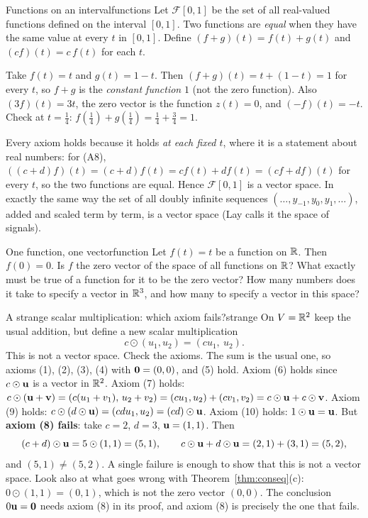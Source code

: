 \documentclass[11pt]{article}
\begin{document}
\begin{exmp}{Functions on an interval}{functions}
Let $\mathcal{F}[0,1]$ be the set of all real-valued functions defined on the interval $[0,1]$. Two functions are \emph{equal} when they have the same value at every $t$ in $[0,1]$. Define $(f+g)(t)=f(t)+g(t)$ and $(cf)(t)=c\,f(t)$ for each $t$.

Take $f(t)=t$ and $g(t)=1-t$. Then $(f+g)(t)=t+(1-t)=1$ for every $t$, so $f+g$ is the \emph{constant function} $1$ (not the zero function). Also $(3f)(t)=3t$, the zero vector is the function $z(t)=0$, and $(-f)(t)=-t$. Check at $t=\tfrac14$: $f(\tfrac14)+g(\tfrac14)=\tfrac14+\tfrac34=1$.

Every axiom holds because it holds \emph{at each fixed $t$}, where it is a statement about real numbers: for (A8), $((c+d)f)(t)=(c+d)f(t)=cf(t)+df(t)=(cf+df)(t)$ for every $t$, so the two functions are equal. Hence $\mathcal{F}[0,1]$ is a vector space. In exactly the same way the set of all doubly infinite sequences $(\dots,y_{-1},y_0,y_1,\dots)$, added and scaled term by term, is a vector space (Lay calls it the space of signals).
\end{exmp}

\begin{think}{One function, one vector}{function}
Let $f(t)=t$ be a function on $\mathbb{R}$. Then $f(0)=0$. Is $f$ the zero vector of the space of all functions on $\mathbb{R}$? What exactly must be true of a function for it to be the zero vector? How many numbers does it take to specify a vector in $\mathbb{R}^3$, and how many to specify a vector in this space?
\end{think}

\begin{exmp}{A strange scalar multiplication: which axiom fails?}{strange}
On $V=\mathbb{R}^2$ keep the usual addition, but define a new scalar multiplication
\[
c\odot(u_1,u_2)=(cu_1,\ u_2).
\]
This is not a vector space. Check the axioms. The sum is the usual one, so axioms (1), (2), (3), (4) with $\mathbf{0}=(0,0)$, and (5) hold. Axiom (6) holds since $c\odot\mathbf{u}$ is a vector in $\mathbb{R}^2$. Axiom (7) holds: $c\odot(\mathbf{u}+\mathbf{v})=(c(u_1+v_1),\,u_2+v_2)=(cu_1,u_2)+(cv_1,v_2)=c\odot\mathbf{u}+c\odot\mathbf{v}$. Axiom (9) holds: $c\odot(d\odot\mathbf{u})=(cdu_1,u_2)=(cd)\odot\mathbf{u}$. Axiom (10) holds: $1\odot\mathbf{u}=\mathbf{u}$. But \textbf{axiom (8) fails}: take $c=2$, $d=3$, $\mathbf{u}=(1,1)$. Then
\[
(c+d)\odot\mathbf{u}=5\odot(1,1)=(5,1),\qquad c\odot\mathbf{u}+d\odot\mathbf{u}=(2,1)+(3,1)=(5,2),
\]
and $(5,1)\neq(5,2)$. A single failure is enough to show that this is not a vector space. Look also at what goes wrong with Theorem~\ref{thm:conseq}(c): $0\odot(1,1)=(0,1)$, which is not the zero vector $(0,0)$. The conclusion $0\mathbf{u}=\mathbf{0}$ needs axiom (8) in its proof, and axiom (8) is precisely the one that fails.
\end{exmp}
\end{document}
